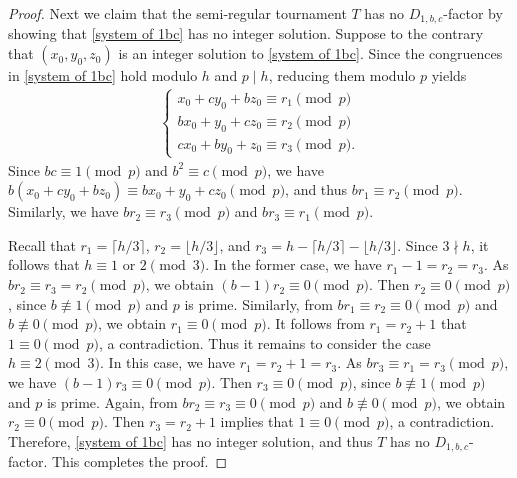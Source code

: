 \documentclass[11pt,a4paper,reqno]{amsart}
\theoremstyle{definition} %
\begin{document}
\begin{proof}
Next we claim that the semi-regular tournament $T$ has no $D_{1,b,c}$-factor by showing that \eqref{system of 1bc} has no integer solution. Suppose to the contrary that $(x_0,y_0,z_0)$ is an integer solution to \eqref{system of 1bc}. Since the congruences in \eqref{system of 1bc} hold modulo $h$ and $p\mid h$, reducing them modulo $p$ yields
\begin{align*}
\begin{cases}
    x_0+cy_0+bz_0\equiv r_1 \pmod p\\
bx_0+y_0+cz_0\equiv r_2 \pmod p\\
cx_0+by_0+z_0\equiv r_3 \pmod p.
\end{cases}
\end{align*}
Since $bc \equiv 1 \pmod p$ and $b^2 \equiv c \pmod p$, we have
$b(x_0+cy_0+bz_0)\equiv bx_0+y_0+cz_0\pmod{p}$,
and thus
$br_1\equiv r_2 \pmod{p}$.
Similarly, we have $br_2\equiv r_3 \pmod{p}$ and $br_3\equiv r_1 \pmod{p}$.

Recall that $r_1=\lceil h/3\rceil$, $r_2=\lfloor h/3 \rfloor$, and
$r_3=h-\lceil h/3\rceil-\lfloor h/3\rfloor$.
Since $3\nmid h$, it follows that $h\equiv1$ or $2\pmod{3}$.
In the former case, we have $r_1-1=r_2=r_3$. As
$br_2\equiv r_3 =r_2 \pmod{p}$,
we obtain
$(b-1)r_2\equiv0\pmod{p}$.
Then $r_2\equiv0\pmod{p}$, since $b\not\equiv1\pmod{p}$ and $p$ is prime. Similarly, from
$br_1\equiv r_2\equiv0\pmod{p}$ and $b\not\equiv0\pmod{p}$,
we obtain
$r_1\equiv0\pmod{p}$.
It follows from $r_1=r_2+1$ that
$1\equiv 0\pmod p$,
a contradiction.
Thus it remains to consider the case $h\equiv2\pmod{3}$.
In this case, we have $r_1=r_2+1=r_3$. As
$br_3\equiv r_1 =r_3 \pmod{p}$,
we have
$(b-1)r_3\equiv0\pmod{p}$.
Then $r_3\equiv0\pmod{p}$, since $b\not\equiv1\pmod{p}$ and $p$ is prime. Again, from
$br_2\equiv r_3\equiv0\pmod{p}$ and $b\not\equiv0\pmod{p}$,
we obtain
$r_2\equiv0\pmod{p}$.
Then $r_3=r_2+1$ implies that
$1\equiv 0\pmod p$,
a contradiction.
Therefore, \eqref{system of 1bc} has no integer solution, and thus $T$ has no $D_{1,b,c}$-factor. This completes the proof.
\end{proof}



\end{document}
